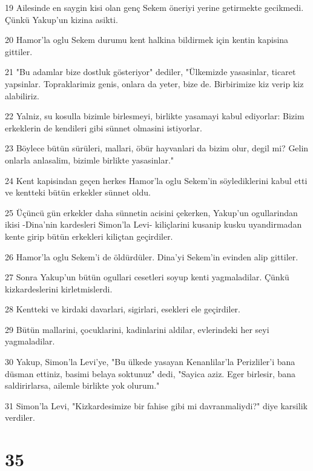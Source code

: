 \par 19 Ailesinde en saygin kisi olan genç Sekem öneriyi yerine getirmekte gecikmedi. Çünkü Yakup'un kizina asikti.
\par 20 Hamor'la oglu Sekem durumu kent halkina bildirmek için kentin kapisina gittiler.
\par 21 "Bu adamlar bize dostluk gösteriyor" dediler, "Ülkemizde yasasinlar, ticaret yapsinlar. Topraklarimiz genis, onlara da yeter, bize de. Birbirimize kiz verip kiz alabiliriz.
\par 22 Yalniz, su kosulla bizimle birlesmeyi, birlikte yasamayi kabul ediyorlar: Bizim erkeklerin de kendileri gibi sünnet olmasini istiyorlar.
\par 23 Böylece bütün sürüleri, mallari, öbür hayvanlari da bizim olur, degil mi? Gelin onlarla anlasalim, bizimle birlikte yasasinlar."
\par 24 Kent kapisindan geçen herkes Hamor'la oglu Sekem'in söylediklerini kabul etti ve kentteki bütün erkekler sünnet oldu.
\par 25 Üçüncü gün erkekler daha sünnetin acisini çekerken, Yakup'un ogullarindan ikisi -Dina'nin kardesleri Simon'la Levi- kiliçlarini kusanip kusku uyandirmadan kente girip bütün erkekleri kiliçtan geçirdiler.
\par 26 Hamor'la oglu Sekem'i de öldürdüler. Dina'yi Sekem'in evinden alip gittiler.
\par 27 Sonra Yakup'un bütün ogullari cesetleri soyup kenti yagmaladilar. Çünkü kizkardeslerini kirletmislerdi.
\par 28 Kentteki ve kirdaki davarlari, sigirlari, esekleri ele geçirdiler.
\par 29 Bütün mallarini, çocuklarini, kadinlarini aldilar, evlerindeki her seyi yagmaladilar.
\par 30 Yakup, Simon'la Levi'ye, "Bu ülkede yasayan Kenanlilar'la Perizliler'i bana düsman ettiniz, basimi belaya soktunuz" dedi, "Sayica aziz. Eger birlesir, bana saldirirlarsa, ailemle birlikte yok olurum."
\par 31 Simon'la Levi, "Kizkardesimize bir fahise gibi mi davranmaliydi?" diye karsilik verdiler.

\chapter{35}

